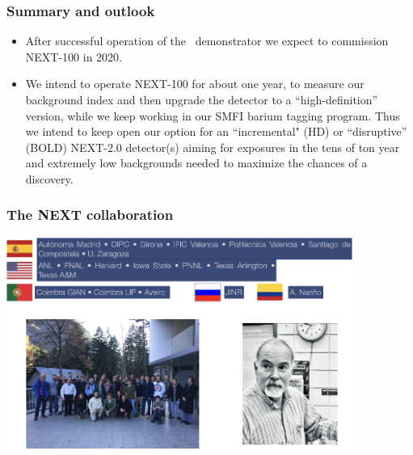 \documentclass[9pt]{beamer}
\begin{document}
\begin{frame}
\frametitle{Summary and outlook}
\begin{itemize} 
\item  After successful operation of the \NEW\ demonstrator we expect to commission NEXT-100 in 2020. 
\item We intend to operate NEXT-100 for about one year, to measure our background index and then upgrade the detector to a ``high-definition'' version, while we keep working in our SMFI barium tagging program. Thus we intend to keep open our option for an ``incremental" (HD) or ``disruptive'' (BOLD) NEXT-2.0 detector(s) aiming for exposures in the tens of ton year and extremely low backgrounds needed to maximize the chances of a discovery.   
\end{itemize}
\end{frame}
\begin{frame}

\frametitle{The NEXT collaboration}
  \begin{center}
      \includegraphics[width=0.85\textwidth]{moriond/next-coll.png}
  \end{center}
\end{frame}
\end{document}
